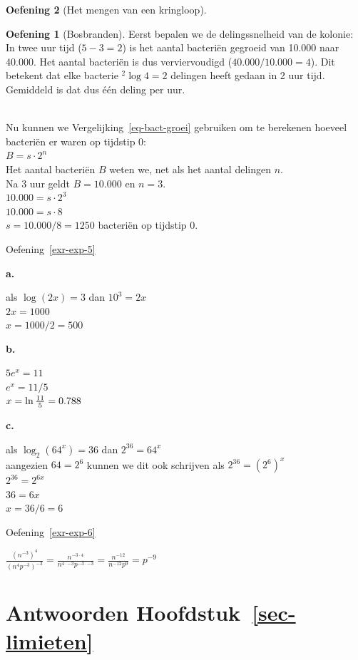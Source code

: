 \documentclass[
  a4paper,
]{scrbook}
\theoremstyle{definition}
\newtheorem{exercise}{Oefening}[chapter]
\theoremstyle{remark}
\begin{document}
\begin{exercise}[Het mengen van een
kringloop]
\begin{exercise}[Bosbranden]
Eerst bepalen we de delingssnelheid van de kolonie:\\
In twee uur tijd (\(5 - 3 = 2\)) is het aantal bacteriën gegroeid van
10.000 naar 40.000. Het aantal bacteriën is dus verviervoudigd
(\(40.000/10.000=4\)). Dit betekent dat elke bacterie \(^2\log{4} = 2\)
delingen heeft gedaan in 2 uur tijd. Gemiddeld is dat dus één deling per
uur.\\
\strut \\
Nu kunnen we Vergelijking~\ref{eq-bact-groei} gebruiken om te berekenen
hoeveel bacteriën er waren op tijdstip 0:\\
\(B = s\cdot2^n\)\\
Het aantal bacteriën \(B\) weten we, net als het aantal delingen
\(n\).\\
Na 3 uur geldt \(B = 10.000\) en \(n = 3\).\\
\(10.000 = s\cdot2^3\)\\
\(10.000 = s\cdot8\)\\
\(s = 10.000 / 8 = 1250\) bacteriën op tijdstip 0.

Oefening~\ref{exr-exp-5}

\textbf{a.}

als \(\log (2x) = 3\) dan \(10^3 = 2x\)\\
\(2x = 1000\)\\
\(x = 1000/2 = 500\)

\textbf{b.}

\(5e^x=11\)\\
\(e^x=11/5\)\\
\(x = \ln{11 \over 5} = 0.788\)

\textbf{c.}

als \(\log_2(64^x)=36\) dan \(2^{36} = 64^x\)\\
aangezien \(64=2^6\) kunnen we dit ook schrijven als
\(2^{36} = (2^6)^x\)\\
\(2^{36} = 2^{6x}\)\\
\(36 = 6x\)\\
\(x = 36/6 = 6\)

Oefening~\ref{exr-exp-6}

\(\frac{(n^{-3})^4}{(n^{4}p^{-3})^{-3}}=\frac{n^{-3\cdot4}}{n^{4\cdot-3}p^{-3\cdot-3}}=\frac{n^{-12}}{n^{-12}p^{9}}=p^{-9}\)

\section*{\texorpdfstring{Antwoorden
Hoofdstuk~\ref{sec-limieten}}{Antwoorden Hoofdstuk~}}\label{antwoorden-sec-limieten}


\end{exercise}
\end{exercise}
\end{document}
